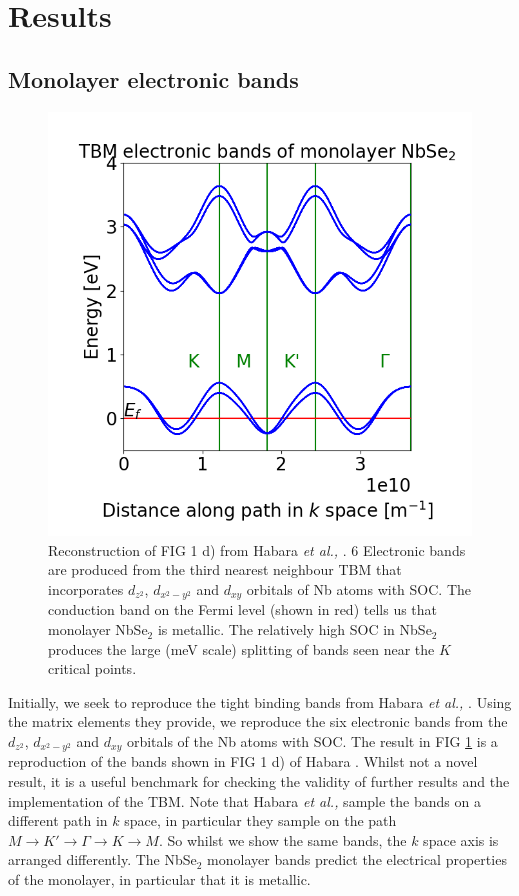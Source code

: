\documentclass[12pt]{report} %
\begin{document}
\section*{Results}

\subsection*{Monolayer electronic bands}
%
\begin{figure}[t!]
\centering
  \includegraphics[width=0.6\columnwidth]{monolayer_bands.png}
  \caption{
    Reconstruction of FIG 1 d) from Habara \textit{et al.,} \cite{Habara2021}. 6 Electronic bands are produced from the third nearest neighbour TBM that incorporates $d_{z^2}$, $d_{x^2 - y^2}$ and $d_{xy}$ orbitals of Nb atoms with SOC. The conduction band on the Fermi level (shown in red) tells us that monolayer NbSe$_2$ is metallic. The relatively high SOC in NbSe$_2$ produces the large (meV scale) splitting of bands seen near the $K$ critical points.
  }
  \label{monolayer_bands}
\end{figure}

Initially, we seek to reproduce the tight binding bands from Habara \textit{et al.,} \cite{Habara2021}. Using the matrix elements they provide, we reproduce the six electronic bands from the $d_{z^2}$, $d_{x^2 - y^2}$ and $d_{xy}$ orbitals of the Nb atoms with SOC. The result in FIG \ref{monolayer_bands} is a reproduction of the bands shown in FIG 1 d) of Habara \cite{Habara2021}. Whilst not a novel result, it is a useful benchmark for checking the validity of further results and the implementation of the TBM. Note that Habara \textit{et al.,} sample the bands on a different path in $k$ space, in particular they sample on the path  $M \rightarrow K' \rightarrow \Gamma \rightarrow K \rightarrow M$. So whilst we show the same bands, the $k$ space axis is arranged differently. The NbSe$_2$ monolayer bands predict the electrical properties of the monolayer, in particular that it is metallic.
\end{document}
